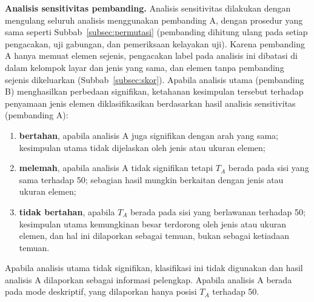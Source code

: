 \textbf{Analisis sensitivitas pembanding.} Analisis sensitivitas dilakukan dengan mengulang seluruh analisis menggunakan pembanding A, dengan prosedur yang sama seperti Subbab~\ref{subsec:permutasi} (pembanding dihitung ulang pada setiap pengacakan, uji gabungan, dan pemeriksaan kelayakan uji). Karena pembanding A hanya memuat elemen sejenis, pengacakan label pada analisis ini dibatasi di dalam kelompok layar dan jenis yang sama, dan elemen tanpa pembanding sejenis dikeluarkan (Subbab~\ref{subsec:skor}). Apabila analisis utama (pembanding B) menghasilkan perbedaan signifikan, ketahanan kesimpulan tersebut terhadap penyamaan jenis elemen diklasifikasikan berdasarkan hasil analisis sensitivitas (pembanding A):
\begin{enumerate}
  \item \textbf{bertahan}, apabila analisis A juga signifikan dengan arah yang sama; kesimpulan utama tidak dijelaskan oleh jenis atau ukuran elemen;
  \item \textbf{melemah}, apabila analisis A tidak signifikan tetapi $T_A$ berada pada sisi yang sama terhadap 50; sebagian hasil mungkin berkaitan dengan jenis atau ukuran elemen;
  \item \textbf{tidak bertahan}, apabila $T_A$ berada pada sisi yang berlawanan terhadap 50; kesimpulan utama kemungkinan besar terdorong oleh jenis atau ukuran elemen, dan hal ini dilaporkan sebagai temuan, bukan sebagai ketiadaan temuan.
\end{enumerate}
Apabila analisis utama tidak signifikan, klasifikasi ini tidak digunakan dan hasil analisis A dilaporkan sebagai informasi pelengkap. Apabila analisis A berada pada mode deskriptif, yang dilaporkan hanya posisi $T_A$ terhadap 50.


